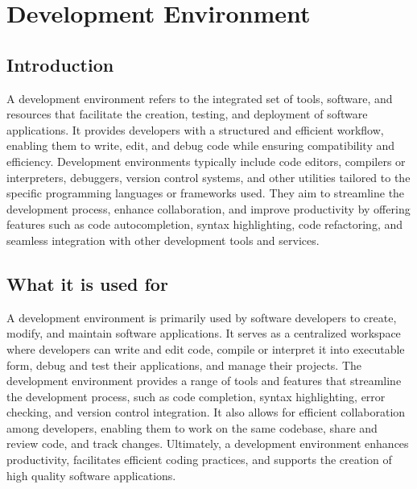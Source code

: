 %
%




\chapter{Development Environment}

\section{Introduction}

A development environment refers to the integrated set of tools, software, and resources that facilitate the creation, testing, and deployment of software applications. It provides developers with a structured and efficient workflow, enabling them to write, edit, and debug code while ensuring compatibility and efficiency. Development environments typically include code editors, compilers or interpreters, debuggers, version control systems, and other utilities tailored to the specific programming languages or frameworks used. They aim to streamline the development process, enhance collaboration, and improve productivity by offering features such as code autocompletion, syntax highlighting, code refactoring, and seamless integration with other development tools and services.

\section{What it is used for}

A development environment is primarily used by software developers to create, modify, and maintain software applications. It serves as a centralized workspace where developers can write and edit code, compile or interpret it into executable form, debug and test their applications, and manage their projects. The development environment provides a range of tools and features that streamline the development process, such as code completion, syntax highlighting, error checking, and version control integration. It also allows for efficient collaboration among developers, enabling them to work on the same codebase, share and review code, and track changes. Ultimately, a development environment enhances productivity, facilitates efficient coding practices, and supports the creation of high quality software applications.

